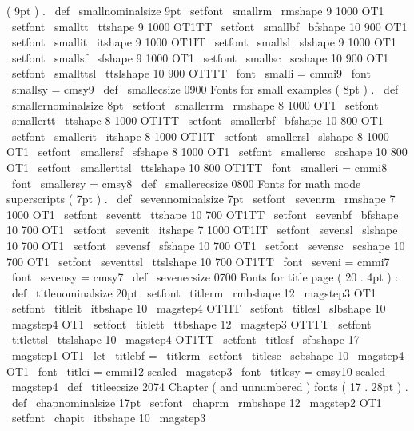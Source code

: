 {{{{(
9pt
)
.
\
def
\
smallnominalsize
{
9pt
}
\
setfont
\
smallrm
\
rmshape
{
9
}
{
1000
}
{
OT1
}
\
setfont
\
smalltt
\
ttshape
{
9
}
{
1000
}
{
OT1TT
}
\
setfont
\
smallbf
\
bfshape
{
10
}
{
900
}
{
OT1
}
\
setfont
\
smallit
\
itshape
{
9
}
{
1000
}
{
OT1IT
}
\
setfont
\
smallsl
\
slshape
{
9
}
{
1000
}
{
OT1
}
\
setfont
\
smallsf
\
sfshape
{
9
}
{
1000
}
{
OT1
}
\
setfont
\
smallsc
\
scshape
{
10
}
{
900
}
{
OT1
}
\
setfont
\
smallttsl
\
ttslshape
{
10
}
{
900
}
{
OT1TT
}
\
font
\
smalli
=
cmmi9
\
font
\
smallsy
=
cmsy9
\
def
\
smallecsize
{
0900
}
%
Fonts
for
small
examples
(
8pt
)
.
\
def
\
smallernominalsize
{
8pt
}
\
setfont
\
smallerrm
\
rmshape
{
8
}
{
1000
}
{
OT1
}
\
setfont
\
smallertt
\
ttshape
{
8
}
{
1000
}
{
OT1TT
}
\
setfont
\
smallerbf
\
bfshape
{
10
}
{
800
}
{
OT1
}
\
setfont
\
smallerit
\
itshape
{
8
}
{
1000
}
{
OT1IT
}
\
setfont
\
smallersl
\
slshape
{
8
}
{
1000
}
{
OT1
}
\
setfont
\
smallersf
\
sfshape
{
8
}
{
1000
}
{
OT1
}
\
setfont
\
smallersc
\
scshape
{
10
}
{
800
}
{
OT1
}
\
setfont
\
smallerttsl
\
ttslshape
{
10
}
{
800
}
{
OT1TT
}
\
font
\
smalleri
=
cmmi8
\
font
\
smallersy
=
cmsy8
\
def
\
smallerecsize
{
0800
}
%
Fonts
for
math
mode
superscripts
(
7pt
)
.
\
def
\
sevennominalsize
{
7pt
}
\
setfont
\
sevenrm
\
rmshape
{
7
}
{
1000
}
{
OT1
}
\
setfont
\
seventt
\
ttshape
{
10
}
{
700
}
{
OT1TT
}
\
setfont
\
sevenbf
\
bfshape
{
10
}
{
700
}
{
OT1
}
\
setfont
\
sevenit
\
itshape
{
7
}
{
1000
}
{
OT1IT
}
\
setfont
\
sevensl
\
slshape
{
10
}
{
700
}
{
OT1
}
\
setfont
\
sevensf
\
sfshape
{
10
}
{
700
}
{
OT1
}
\
setfont
\
sevensc
\
scshape
{
10
}
{
700
}
{
OT1
}
\
setfont
\
seventtsl
\
ttslshape
{
10
}
{
700
}
{
OT1TT
}
\
font
\
seveni
=
cmmi7
\
font
\
sevensy
=
cmsy7
\
def
\
sevenecsize
{
0700
}
%
Fonts
for
title
page
(
20
.
4pt
)
:
\
def
\
titlenominalsize
{
20pt
}
\
setfont
\
titlerm
\
rmbshape
{
12
}
{
\
magstep3
}
{
OT1
}
\
setfont
\
titleit
\
itbshape
{
10
}
{
\
magstep4
}
{
OT1IT
}
\
setfont
\
titlesl
\
slbshape
{
10
}
{
\
magstep4
}
{
OT1
}
\
setfont
\
titlett
\
ttbshape
{
12
}
{
\
magstep3
}
{
OT1TT
}
\
setfont
\
titlettsl
\
ttslshape
{
10
}
{
\
magstep4
}
{
OT1TT
}
\
setfont
\
titlesf
\
sfbshape
{
17
}
{
\
magstep1
}
{
OT1
}
\
let
\
titlebf
=
\
titlerm
\
setfont
\
titlesc
\
scbshape
{
10
}
{
\
magstep4
}
{
OT1
}
\
font
\
titlei
=
cmmi12
scaled
\
magstep3
\
font
\
titlesy
=
cmsy10
scaled
\
magstep4
\
def
\
titleecsize
{
2074
}
%
Chapter
(
and
unnumbered
)
fonts
(
17
.
28pt
)
.
\
def
\
chapnominalsize
{
17pt
}
\
setfont
\
chaprm
\
rmbshape
{
12
}
{
\
magstep2
}
{
OT1
}
\
setfont
\
chapit
\
itbshape
{
10
}
{
\
magstep3
}
{
}}}}}
